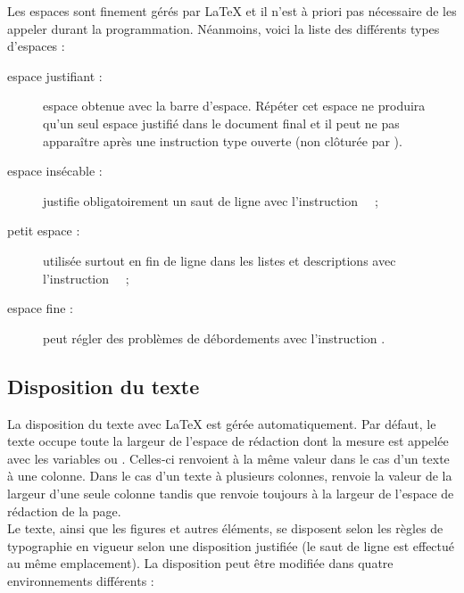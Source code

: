 \documentclass[a4paper, 11pt, twoside, fleqn]{memoir}
\begin{document}
	Les espaces sont finement gérés par \LaTeX{} et il n'est à priori pas nécessaire de les appeler durant la programmation. Néanmoins, voici la liste des différents types d'espaces :
	\begin{description}
		\item[espace justifiant :] espace obtenue avec la barre d'espace. Répéter cet espace ne produira qu'un seul espace justifié dans le document final et il peut ne pas apparaître après une instruction type \og ouverte \fg{} (non clôturée par \texttt{{}} ).
		\item[espace insécable :] justifie obligatoirement un saut de ligne avec l'instruction \texttt{~} \,;
		\item[petit espace :] utilisée surtout en fin de ligne dans les listes et descriptions avec l'instruction \texttt{\,} \,;
		\item[espace fine :] peut régler des problèmes de débordements avec l'instruction \texttt{\/} .
	\end{description}
	
	\subsection{Disposition du texte}
	
La disposition du texte avec \LaTeX{} est gérée automatiquement. Par défaut, le texte occupe toute la largeur de l'espace de rédaction dont la mesure est appelée avec les variables \texttt{\linewidth} ou \texttt{\textwidth} . Celles-ci renvoient à la même valeur dans le cas d'un texte à une colonne. Dans le cas d'un texte à plusieurs colonnes, \texttt{\linewidth} renvoie la valeur de la largeur d'une seule colonne tandis que \texttt{\textwidth} renvoie toujours à la largeur de l'espace de rédaction de la page.\\

Le texte, ainsi que les figures et autres éléments, se disposent selon les règles de typographie en vigueur selon une disposition \og justifiée \fg{} (le saut de ligne est effectué au même emplacement). La disposition peut être modifiée dans quatre environnements différents :
\end{document}
